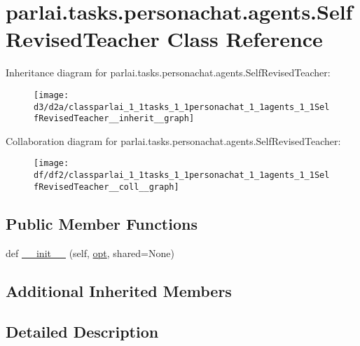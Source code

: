 \hypertarget{classparlai_1_1tasks_1_1personachat_1_1agents_1_1SelfRevisedTeacher}{}\section{parlai.\+tasks.\+personachat.\+agents.\+Self\+Revised\+Teacher Class Reference}
\label{classparlai_1_1tasks_1_1personachat_1_1agents_1_1SelfRevisedTeacher}


Inheritance diagram for parlai.\+tasks.\+personachat.\+agents.\+Self\+Revised\+Teacher\+:\nopagebreak
\begin{figure}[H]
\begin{center}
\leavevmode
\texttt{[image: d3/d2a/classparlai\_1\_1tasks\_1\_1personachat\_1\_1agents\_1\_1SelfRevisedTeacher\_\_inherit\_\_graph]}
\end{center}
\end{figure}


Collaboration diagram for parlai.\+tasks.\+personachat.\+agents.\+Self\+Revised\+Teacher\+:\nopagebreak
\begin{figure}[H]
\begin{center}
\leavevmode
\texttt{[image: df/df2/classparlai\_1\_1tasks\_1\_1personachat\_1\_1agents\_1\_1SelfRevisedTeacher\_\_coll\_\_graph]}
\end{center}
\end{figure}
\subsection*{Public Member Functions}
\begin{DoxyCompactItemize}
\item 
def \hyperlink{classparlai_1_1tasks_1_1personachat_1_1agents_1_1SelfRevisedTeacher_a7d6545ffc585ee5edc99b2ce5a117aeb}{\+\_\+\+\_\+init\+\_\+\+\_\+} (self, \hyperlink{classparlai_1_1core_1_1teachers_1_1FbDialogTeacher_af7a9ec497b9cd0292d7b8fa220da7c28}{opt}, shared=None)
\end{DoxyCompactItemize}
\subsection*{Additional Inherited Members}


\subsection{Detailed Description}


